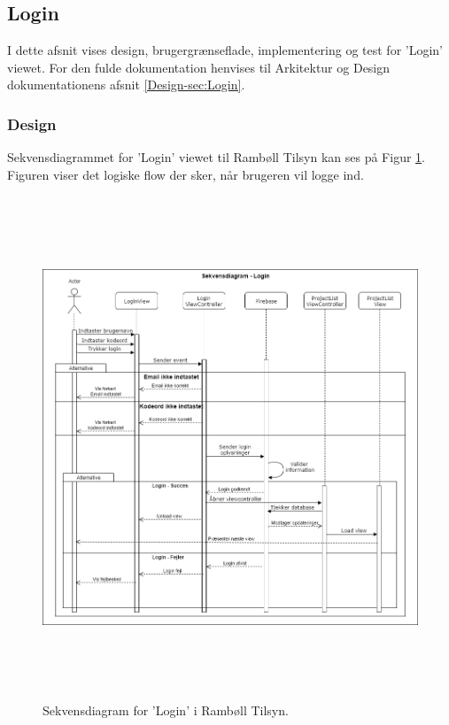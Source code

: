 \subsection{Login}
I dette afsnit vises design, brugergrænseflade, implementering og test for 'Login' viewet. For den fulde dokumentation henvises til Arkitektur og Design dokumentationens afsnit \ref{Design-sec:Login}.
\subsubsection{Design}
Sekvensdiagrammet for 'Login' viewet til Rambøll Tilsyn kan ses på Figur \ref{fig:LoginSekvens}. Figuren viser det logiske flow der sker, når brugeren vil logge ind.
\begin{figure}[H] %
	\centering
	\includegraphics[height=15cm, width=15cm]{Design/Applikation/Login/LoginSekvensDiagram}
	\caption{Sekvensdiagram for 'Login' i Rambøll Tilsyn.}
	\label{fig:LoginSekvens}
\end{figure}

\clearpage


